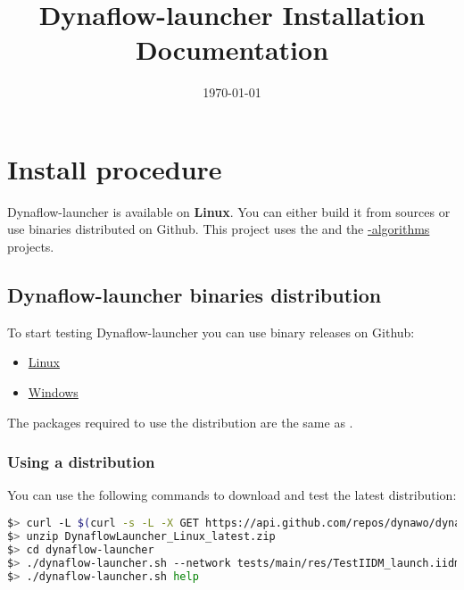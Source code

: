 \documentclass[a4paper, 12pt]{report}
\begin{document}
\title{Dynaflow-launcher Installation Documentation}
\date\today

\maketitle
\tableofcontents

\chapter{Install procedure}

Dynaflow-launcher is available on \textbf{Linux}.
You can either build it from sources or use binaries distributed on Github.
This project uses the \href{https://github.com/dynawo/dynawo}{\Dynawo}  and the \href{https://github.com/dynawo/dynawo-algorithms}{\Dynawo-algorithms} projects.

\section{Dynaflow-launcher binaries distribution}

To start testing Dynaflow-launcher you can use binary releases on Github:
\begin{itemize}
\item
  \href{https://github.com/dynawo/dynaflow-launcher/releases/download/v1.5.0/DynaFlowLauncher_Linux_v1.5.0.zip}{Linux}
\item
  \href{https://github.com/dynawo/dynaflow-launcher/releases/download/v1.5.0/DynaFlowLauncher_Windows_v1.5.0.zip}{Windows}
\end{itemize}

The packages required to use the distribution are the same as \Dynawo.

\subsection{Using a distribution}

You can use the following commands to download and test the latest distribution:
\begin{lstlisting}[language=bash, breaklines=true, breakatwhitespace=false, columns=fullflexible]
$> curl -L $(curl -s -L -X GET https://api.github.com/repos/dynawo/dynaflow-launcher/releases/latest | grep "DynaFlowLauncher_Linux" | grep url | cut -d '"' -f 4) -o DynaflowLauncher_Linux_latest.zip
$> unzip DynaflowLauncher_Linux_latest.zip
$> cd dynaflow-launcher
$> ./dynaflow-launcher.sh --network tests/main/res/TestIIDM_launch.iidm --config tests/main/res/config_launch.json
$> ./dynaflow-launcher.sh help
\end{lstlisting}
\end{document}
